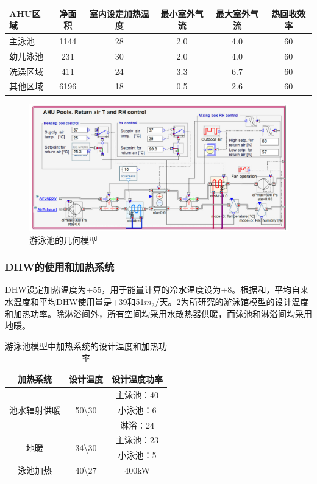 \documentclass[hyperref]{ctexart}
\begin{document}
\begin{multicols}{2}
\begin{table}[htbp]
\begin{tabular}{lccccc}
				\toprule    
				AHU区域 & 净面积 & 室内设定加热温度 & 最小室外气流 & 最大室外气流 & 热回收效率\\
				\midrule
				主泳池   & 1144 & 28 & 2.0 & 4.0 & 60\\
				幼儿泳池 & 231 & 30 & 2.0 & 4.0 & 60\\
				洗澡区域 & 411 & 24 & 3.3 & 6.7 & 60  \\
				其他区域 & 6196 & 18 & 0.5 & 2.6 & 60 \\
				\bottomrule  
			\end{tabular}
			\label{tab6}
		\end{table}
		\begin{figure}[htbp]
			\centering
			\includegraphics[scale=0.4]{figure_translate/5.png}
			\caption{游泳池的几何模型}
			\label{fig5}
		\end{figure}
		\subsubsection{DHW的使用和加热系统}
		DHW设定加热温度为+55\textcelsius，用于能量计算的冷水温度设为+8\textcelsius。根据\cite{article22}和\cite{article40}，平均自来水温度和平均DHW使用量是+39\textcelsius 和51$m_{3}/天$。\cref{tab7}为所研究的游泳馆模型的设计温度和加热功率。除淋浴间外，所有空间均采用水散热器供暖，而泳池和淋浴间均采用地暖。
		\par
		\begin{table}[H]
			\centering
			\caption{游泳池模型中加热系统的设计温度和加热功率}
			\begin{tabular}{ccc}
				\toprule    
				加热系统 & 设计温度 & 设计温度功率\\
				\midrule
				\multirow{3}{*}{池水辐射供暖} & \multirow{3}{*}{50\textbackslash 30}  & 主泳池：40\\
				~ & ~ & 小泳池：6\\
				~ & ~ & 淋浴：24\\
				\multirow{2}{*}{地暖} & \multirow{2}{*}{34\textbackslash 30} & 主泳池：23\\
				~ & ~ & 小泳池：5\\
				泳池加热 & 40\textbackslash 27 & 400kW\\
				\bottomrule  
			\end{tabular}
			\label{tab7}
		\end{table}

\end{multicols}
\end{document}
